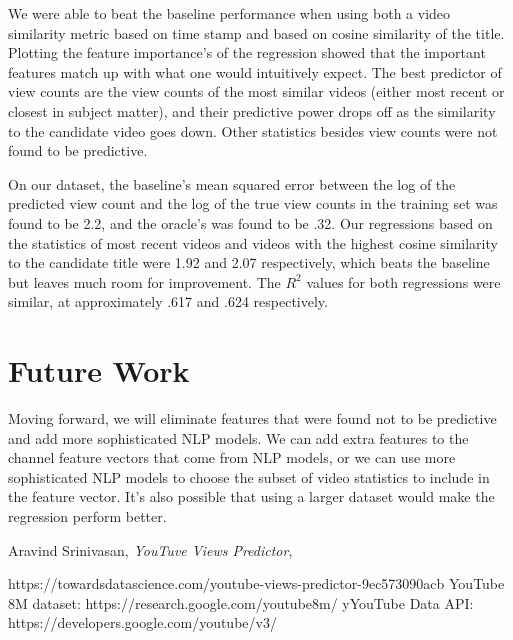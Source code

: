 \documentclass[12pt]{article}
\theoremstyle{definition}
\theoremstyle{remark}
\begin{document}
We were able to beat the baseline performance when using both a video similarity
metric based on time stamp and based on cosine similarity of the title. Plotting
the feature importance's of the regression showed that the important features
match up with what one would intuitively expect. The best predictor of view
counts are the view counts of the most similar videos (either most recent or
closest in subject matter), and their predictive power drops off as the
similarity to the candidate video goes down. Other statistics besides view
counts were not found to be predictive.

On our dataset, the baseline's mean squared error between the log of the
predicted view count and the log of the true view counts in the training set was
found to be 2.2, and the oracle's was found to be .32. Our regressions based on
the statistics of most recent videos and videos with the highest cosine
similarity to the candidate title were 1.92 and 2.07 respectively, which beats
the baseline but leaves much room for improvement. The $R^2$ values for both
regressions were similar, at approximately .617 and .624 respectively.


\section{Future Work}

Moving forward, we will eliminate features that were found not to be predictive
and add more sophisticated NLP models. We can add extra features to the channel
feature vectors that come from NLP models, or we can use more sophisticated NLP
models to choose the subset of video statistics to include in the feature vector.
It's also possible that using a larger dataset would make the regression perform better.

\begin{thebibliography}{99}

 Aravind Srinivasan, \emph{YouTuve Views Predictor}, 

    \qquad https://towardsdatascience.com/youtube-views-predictor-9ec573090acb
YouTube 8M dataset: https://research.google.com/youtube8m/
yYouTube Data API: https://developers.google.com/youtube/v3/



\end{thebibliography}
\end{document}
